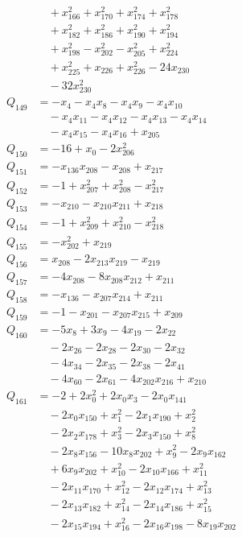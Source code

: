 \begin{align*}
&\quad +x_{166}^{2}+x_{170}^{2}+x_{174}^{2}+x_{178}^{2}\\
&\quad +x_{182}^{2}+x_{186}^{2}+x_{190}^{2}+x_{194}^{2}\\
&\quad +x_{198}^{2}-x_{202}^{2}-x_{205}^{2}+x_{224}^{2}\\
&\quad +x_{225}^{2}+x_{226}+x_{226}^{2}-24x_{230}\\
&\quad -32x_{230}^{2}\\
Q_{149}&=-x_{4}-x_{4}x_{8}-x_{4}x_{9}-x_{4}x_{10}\\
&\quad -x_{4}x_{11}-x_{4}x_{12}-x_{4}x_{13}-x_{4}x_{14}\\
&\quad -x_{4}x_{15}-x_{4}x_{16}+x_{205}\\
Q_{150}&=-16+x_{0}-2x_{206}^{2}\\
Q_{151}&=-x_{136}x_{208}-x_{208}+x_{217}\\
Q_{152}&=-1+x_{207}^{2}+x_{208}^{2}-x_{217}^{2}\\
Q_{153}&=-x_{210}-x_{210}x_{211}+x_{218}\\
Q_{154}&=-1+x_{209}^{2}+x_{210}^{2}-x_{218}^{2}\\
Q_{155}&=-x_{202}^{2}+x_{219}\\
Q_{156}&=x_{208}-2x_{213}x_{219}-x_{219}\\
Q_{157}&=-4x_{208}-8x_{208}x_{212}+x_{211}\\
Q_{158}&=-x_{136}-x_{207}x_{214}+x_{211}\\
Q_{159}&=-1-x_{201}-x_{207}x_{215}+x_{209}\\
Q_{160}&=-5x_{8}+3x_{9}-4x_{19}-2x_{22}\\
&\quad -2x_{26}-2x_{28}-2x_{30}-2x_{32}\\
&\quad -4x_{34}-2x_{35}-2x_{38}-2x_{41}\\
&\quad -4x_{60}-2x_{61}-4x_{202}x_{216}+x_{210}\\
Q_{161}&=-2+2x_{0}^{2}+2x_{0}x_{3}-2x_{0}x_{141}\\
&\quad -2x_{0}x_{150}+x_{1}^{2}-2x_{1}x_{190}+x_{2}^{2}\\
&\quad -2x_{2}x_{178}+x_{3}^{2}-2x_{3}x_{150}+x_{8}^{2}\\
&\quad -2x_{8}x_{156}-10x_{8}x_{202}+x_{9}^{2}-2x_{9}x_{162}\\
&\quad +6x_{9}x_{202}+x_{10}^{2}-2x_{10}x_{166}+x_{11}^{2}\\
&\quad -2x_{11}x_{170}+x_{12}^{2}-2x_{12}x_{174}+x_{13}^{2}\\
&\quad -2x_{13}x_{182}+x_{14}^{2}-2x_{14}x_{186}+x_{15}^{2}\\
&\quad -2x_{15}x_{194}+x_{16}^{2}-2x_{16}x_{198}-8x_{19}x_{202}\\

\end{align*}
